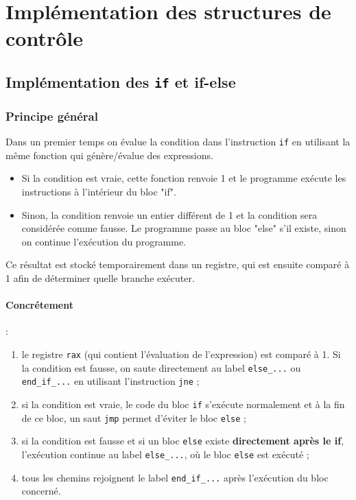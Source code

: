 \documentclass[a4paper, 12pt]{report}
\begin{document}
\section{Implémentation des structures de contrôle}
\subsection{Implémentation des \texttt{if} et if-else}
\subsubsection{Principe général}
Dans un premier temps on évalue la condition dans l'instruction \texttt{if} en utilisant la même fonction qui génère/évalue des expressions. 

\renewcommand{\labelitemi}{\textbullet}
\begin{itemize}
	\item Si la condition est vraie, cette fonction renvoie 1 et le programme exécute les instructions à l'intérieur du bloc "if". 
	\item Sinon, la condition renvoie un entier différent de 1 et la condition sera considérée comme fausse. Le programme passe au bloc "else" s'il existe, sinon on continue l'exécution du programme.
\end{itemize}
Ce résultat est stocké temporairement dans un registre, qui est ensuite comparé à 1 afin de déterminer quelle branche exécuter.\\ 

\paragraph*{Concrétement} :

\begin{enumerate}
	\item le registre \texttt{rax} (qui contient l'évaluation de l'expression) est comparé à 1. Si la condition est fausse, on saute directement au label \texttt{else\_...} ou \texttt{end\_if\_...} en utilisant l'instruction \texttt{jne} ;
	\item si la condition est vraie, le code du bloc \texttt{if} s'exécute normalement et à la fin de ce bloc, un saut \texttt{jmp} permet d'éviter le bloc \texttt{else} ;
	\item si la condition est fausse et si un bloc \texttt{else} existe \textbf{directement après le if}, l'exécution continue au label \texttt{else\_...}, où le bloc \texttt{else} est exécuté ;
	\item tous les chemins rejoignent le label \texttt{end\_if\_...} après l'exécution du bloc concerné.\\
	
\end{enumerate}
\end{document}

